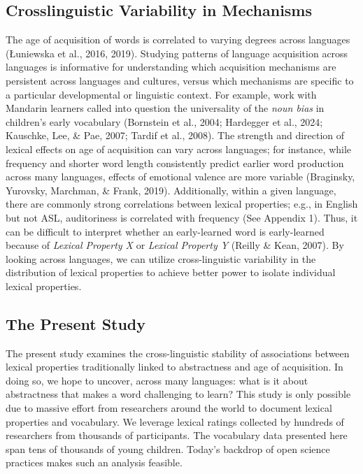 \documentclass[
  man,floatsintext]{apa6}
\begin{document}
\subsection{Crosslinguistic Variability in Mechanisms}\label{crosslinguistic-variability-in-mechanisms}

The age of acquisition of words is correlated to varying degrees across languages (Łuniewska et al., 2016, 2019).
Studying patterns of language acquisition across languages is informative for understanding which acquisition mechanisms are persistent across languages and cultures, versus which mechanisms are specific to a particular developmental or linguistic context. For example, work with Mandarin learners called into question the universality of the \emph{noun bias} in children's early vocabulary (Bornstein et al., 2004; Hardegger et al., 2024; Kauschke, Lee, \& Pae, 2007; Tardif et al., 2008). The strength and direction of lexical effects on age of acquisition can vary across languages; for instance, while frequency and shorter word length consistently predict earlier word production across many languages, effects of emotional valence are more variable (Braginsky, Yurovsky, Marchman, \& Frank, 2019). Additionally, within a given language, there are commonly strong correlations between lexical properties; e.g., in English but not ASL, auditoriness is correlated with frequency (See Appendix 1). Thus, it can be difficult to interpret whether an early-learned word is early-learned because of \emph{Lexical Property X} or \emph{Lexical Property Y} (Reilly \& Kean, 2007). By looking across languages, we can utilize cross-linguistic variability in the distribution of lexical properties to achieve better power to isolate individual lexical properties.

\subsection{The Present Study}\label{the-present-study}

The present study examines the cross-linguistic stability of associations between lexical properties traditionally linked to abstractness and age of acquisition. In doing so, we hope to uncover, across many languages: what is it about abstractness that makes a word challenging to learn? This study is only possible due to massive effort from researchers around the world to document lexical properties and vocabulary. We leverage lexical ratings collected by hundreds of researchers from thousands of participants. The vocabulary data presented here span tens of thousands of young children. Today's backdrop of open science practices makes such an analysis feasible.
\end{document}
